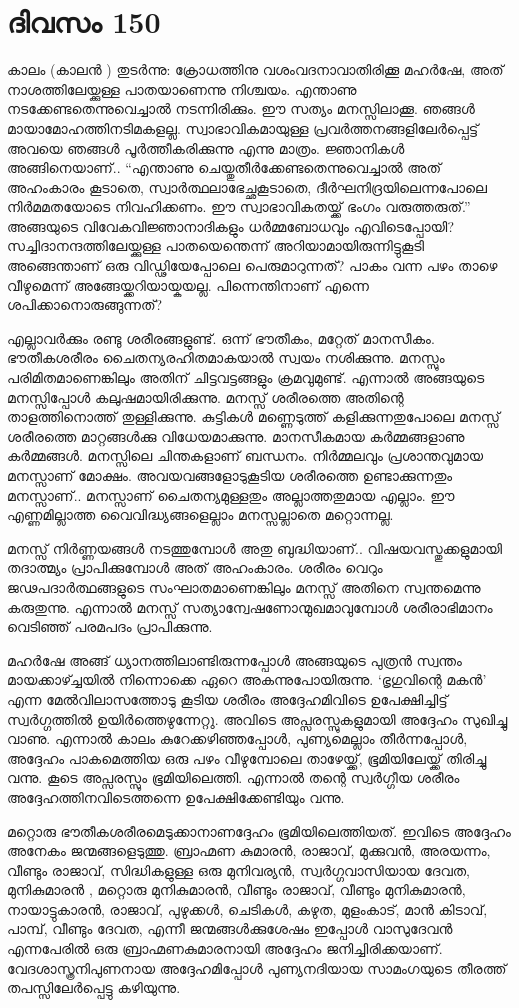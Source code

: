 \section{ദിവസം 150}


കാലം (കാലന്‍ ) തുടർന്നു: ക്രോധത്തിനു വശംവദനാവാതിരിക്കൂ മഹർഷേ, അത് നാശത്തിലേയ്ക്കുള്ള പാതയാണെന്നു നിശ്ചയം. എന്താണു നടക്കേണ്ടതെന്നുവെച്ചാൽ നടന്നിരിക്കും. ഈ സത്യം മനസ്സിലാക്കൂ. ഞങ്ങൾ മായാമോഹത്തിനടിമകളല്ല. സ്വാഭാവികമായുള്ള പ്രവർത്തനങ്ങളിലേർപ്പെട്ട് അവയെ ഞങ്ങൾ പൂർത്തീകരിക്കുന്നു എന്നു മാത്രം. ജ്ഞാനികൾ അങ്ങിനെയാണ്‌.. “എന്താണു ചെയ്തുതീർക്കേണ്ടതെന്നുവെച്ചാൽ അത് അഹംകാരം കൂടാതെ, സ്വാർത്ഥലാഭേച്ഛകൂടാതെ, ദീർഘനിദ്രയിലെന്നപോലെ  നിർമമതയോടെ  നിവഹിക്കണം. ഈ സ്വാഭാവികതയ്ക്ക് ഭംഗം വരുത്തരുത്.” അങ്ങയുടെ വിവേകവിജ്ഞാനാദികളും ധർമ്മബോധവും എവിടെപ്പോയി? സച്ചിദാനന്ദത്തിലേയ്ക്കുള്ള പാതയെന്തെന്ന് അറിയാമായിരുന്നിട്ടുകൂടി അങ്ങെന്താണ്‌ ഒരു വിഡ്ഢിയേപ്പോലെ പെരുമാറുന്നത്? പാകം വന്ന പഴം താഴെ വീഴുമെന്ന് അങ്ങേയ്ക്കറിയായ്കയല്ല. പിന്നെന്തിനാണ്‌ എന്നെ ശപിക്കാനൊരുങ്ങുന്നത്?

എല്ലാവർക്കും രണ്ടു ശരീരങ്ങളുണ്ട്. ഒന്ന് ഭൗതീകം, മറ്റേത് മാനസീകം. ഭൗതീകശരീരം ചൈതന്യരഹിതമാകയാൽ സ്വയം നശിക്കുന്നു. മനസ്സും പരിമിതമാണെങ്കിലും അതിന്‌ ചിട്ടവട്ടങ്ങളും ക്രമവുമുണ്ട്. എന്നാൽ അങ്ങയുടെ മനസ്സിപ്പോൾ കലുഷമായിരിക്കുന്നു. മനസ്സ് ശരീരത്തെ അതിന്റെ താളത്തിനൊത്ത് തുള്ളിക്കുന്നു. കുട്ടികൾ മണ്ണെടുത്ത് കളിക്കുന്നതുപോലെ മനസ്സ് ശരീരത്തെ മാറ്റങ്ങൾക്കു വിധേയമാക്കുന്നു. മാനസീകമായ കർമ്മങ്ങളാണു കർമ്മങ്ങൾ. മനസ്സിലെ ചിന്തകളാണ്‌ ബന്ധനം. നിർമ്മലവും പ്രശാന്തവുമായ മനസ്സാണ്‌ മോക്ഷം. അവയവങ്ങളോടുകൂടിയ ശരീരത്തെ ഉണ്ടാക്കുന്നതും മനസ്സാണ്‌.. മനസ്സാണ് ചൈതന്യമുള്ളതും അല്ലാത്തതുമായ എല്ലാം. ഈ എണ്ണമില്ലാത്ത വൈവിദ്ധ്യങ്ങളെല്ലാം മനസ്സല്ലാതെ മറ്റൊന്നല്ല.

മനസ്സ് നിർണ്ണയങ്ങൾ നടത്തുമ്പോൾ അതു ബുദ്ധിയാണ്‌.. വിഷയവസ്തുക്കളുമായി തദാത്മ്യം പ്രാപിക്കുമ്പോൾ അത് അഹംകാരം. ശരീരം വെറും ജഢപദാർത്ഥങ്ങളുടെ സംഘാതമാണെങ്കിലും മനസ്സ് അതിനെ സ്വന്തമെന്നു കരുതുന്നു. എന്നാൽ മനസ്സ് സത്യാന്വേഷണോന്മുഖമാവുമ്പോൾ ശരീരാഭിമാനം വെടിഞ്ഞ് പരമപദം പ്രാപിക്കുന്നു.

മഹർഷേ അങ്ങ് ധ്യാനത്തിലാണ്ടിരുന്നപ്പോൾ അങ്ങയുടെ പുത്രൻ സ്വന്തം മായക്കാഴ്ച്ചയിൽ നിന്നൊക്കെ ഏറെ അകന്നുപോയിരുന്നു. ‘ഭൃഗുവിന്റെ മകൻ’ എന്ന മേല്‍വിലാസത്തോടു കൂടിയ ശരീരം അദ്ദേഹമിവിടെ ഉപേക്ഷിച്ചിട്ട് സ്വർഗ്ഗത്തിൽ ഉയിർത്തെഴുന്നേറ്റു. അവിടെ അപ്സരസ്സുകളുമായി അദ്ദേഹം സുഖിച്ചു വാണു. എന്നാൽ കാലം കുറേക്കഴിഞ്ഞപ്പോൾ, പുണ്യമെല്ലാം തീർന്നപ്പോൾ, അദ്ദേഹം പാകമെത്തിയ ഒരു പഴം വീഴുമ്പോലെ താഴേയ്ക്ക്, ഭൂമിയിലേയ്ക്ക് തിരിച്ചു വന്നു. കൂടെ അപ്സരസ്സും ഭൂമിയിലെത്തി. എന്നാൽ തന്റെ സ്വർഗ്ഗീയ ശരീരം അദ്ദേഹത്തിനവിടെത്തന്നെ ഉപേക്ഷിക്കേണ്ടിയും വന്നു.

മറ്റൊരു ഭൗതീകശരീരമെടുക്കാനാണദ്ദേഹം ഭൂമിയിലെത്തിയത്. ഇവിടെ അദ്ദേഹം അനേകം ജന്മങ്ങളെടുത്തു. ബ്രാഹ്മണ കുമാരൻ, രാജാവ്, മുക്കുവൻ, അരയന്നം, വീണ്ടും രാജാവ്, സിദ്ധികളുള്ള ഒരു മുനിവര്യൻ, സ്വർഗ്ഗവാസിയായ ദേവത, മുനികുമാരൻ , മറ്റൊരു മുനികുമാരൻ, വീണ്ടും രാജാവ്, വീണ്ടും മുനികുമാരൻ, നായാട്ടുകാരൻ, രാജാവ്, പുഴുക്കൾ, ചെടികൾ, കഴുത, മുളംകാട്, മാൻ കിടാവ്, പാമ്പ്, വീണ്ടും ദേവത, എന്നീ ജന്മങ്ങൾക്കുശേഷം ഇപ്പോൾ വാസുദേവൻ എന്നപേരിൽ ഒരു ബ്രാഹ്മണകുമാരനായി അദ്ദേഹം ജനിച്ചിരിക്കയാണ്‌. വേദശാസ്ത്രനിപുണനായ അദ്ദേഹമിപ്പോൾ പുണ്യനദിയായ സാമംഗയുടെ തീരത്ത് തപസ്സിലേർപ്പെട്ടു കഴിയുന്നു. 
